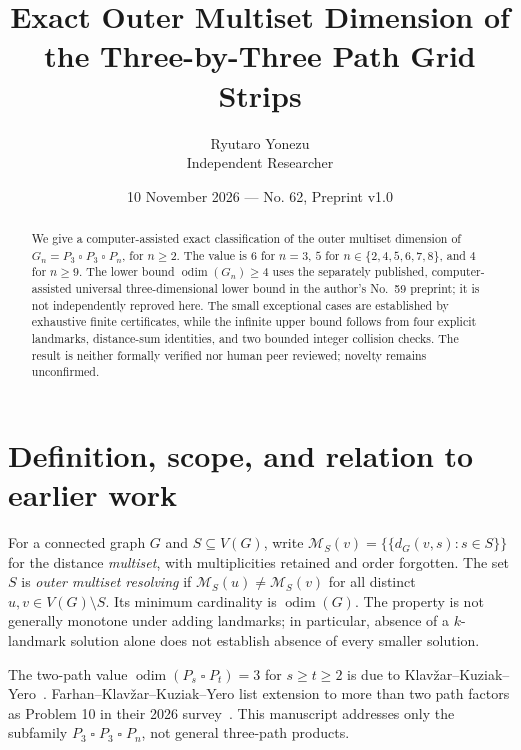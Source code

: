 \documentclass[10pt,a4paper]{article}
\title{\bfseries Exact Outer Multiset Dimension of the Three-by-Three Path Grid Strips}
\author{Ryutaro Yonezu\\\small Independent Researcher}
\date{10 November 2026 --- No. 62, Preprint v1.0}
\newcommand{\odim}{\operatorname{odim}}
\newcommand{\sq}{\mathbin{\square}}
\newcommand{\MS}{\mathcal M}
\begin{document}
\maketitle
\begin{center}
\end{center}
\begin{abstract}
We give a computer-assisted exact classification of the outer multiset dimension of
$G_n=P_3\sq P_3\sq P_n$, for $n\ge2$. The value is $6$ for $n=3$,
$5$ for $n\in\{2,4,5,6,7,8\}$, and $4$ for $n\ge9$.
The lower bound $\odim(G_n)\ge4$ uses the separately published,
computer-assisted universal three-dimensional lower bound in the author's No.~59
preprint; it is not independently reproved here. The small exceptional cases
are established by exhaustive finite certificates, while the infinite upper
bound follows from four explicit landmarks, distance-sum identities, and two
bounded integer collision checks. The result is neither formally verified nor
human peer reviewed; novelty remains unconfirmed.
\end{abstract}

\section{Definition, scope, and relation to earlier work}
For a connected graph $G$ and $S\subseteq V(G)$, write
$\MS_S(v)=\{\!\{d_G(v,s):s\in S\}\!\}$ for the distance \emph{multiset},
with multiplicities retained and order forgotten. The set $S$ is
\emph{outer multiset resolving} if $\MS_S(u)\ne\MS_S(v)$ for all distinct
$u,v\in V(G)\setminus S$. Its minimum cardinality is $\odim(G)$.
The property is not generally monotone under adding landmarks; in particular,
absence of a $k$-landmark solution alone does not establish absence of every
smaller solution.

The two-path value $\odim(P_s\sq P_t)=3$ for $s\ge t\ge2$ is due to
Klav\v{z}ar--Kuziak--Yero~\cite{KKY2023}. Farhan--Klav\v{z}ar--Kuziak--Yero
list extension to more than two path factors as Problem 10 in their
2026 survey~\cite{FKKY2026}. This manuscript addresses only the subfamily
$P_3\sq P_3\sq P_n$, not general three-path products.
\end{document}
